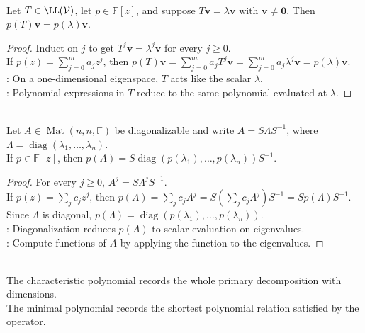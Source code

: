 \begin{proposition} \label{prop:polynomial-eigenvector-evaluation} \\
Let $T\in\LL(\mathcal{V})$, let $p\in\mathbb{F}[z]$, and suppose $T\mathbf{v}=\lambda\mathbf{v}$ with $\mathbf{v}\neq\mathbf{0}$. Then $p(T)\mathbf{v}=p(\lambda)\mathbf{v}$.
\begin{proof}
Induct on $j$ to get $T^j\mathbf{v}=\lambda^j\mathbf{v}$ for every $j\geq0$.\\
If $p(z)=\sum\limits_{j=0}^{m}a_jz^j$, then $p(T)\mathbf{v} =\sum\limits_{j=0}^{m}a_jT^j\mathbf{v} =\sum\limits_{j=0}^{m}a_j\lambda^j\mathbf{v} =p(\lambda)\mathbf{v}$.\\
: On a one-dimensional eigenspace, $T$ acts like the scalar $\lambda$.\\
: Polynomial expressions in $T$ reduce to the same polynomial evaluated at $\lambda$.
\end{proof}
\end{proposition}

\begin{theorem} \label{thm:polynomial-functional-calculus-diagonalizable-matrix} \\
Let $A\in\operatorname{Mat}(n,n,\mathbb{F})$ be diagonalizable and write $A=S\Lambda S^{-1}$, where $\Lambda=\operatorname{diag}(\lambda_1,\ldots,\lambda_n)$.\\
If $p\in\mathbb{F}[z]$, then $p(A)=S\operatorname{diag}(p(\lambda_1),\ldots,p(\lambda_n))S^{-1}$.
\begin{proof}
For every $j\geq0$, $A^j=S\Lambda^jS^{-1}$.\\
If $p(z)=\sum_j c_jz^j$, then $p(A)=\sum\limits_j c_jA^j =S\left(\sum\limits_j c_j\Lambda^j\right)S^{-1} =S p(\Lambda) S^{-1}$.\\
Since $\Lambda$ is diagonal, $p(\Lambda)=\operatorname{diag}(p(\lambda_1),\ldots,p(\lambda_n))$.\\
: Diagonalization reduces $p(A)$ to scalar evaluation on eigenvalues.\\
: Compute functions of $A$ by applying the function to the eigenvalues.
\end{proof}
\end{theorem}

\begin{motivation} \label{mot:characteristic-and-minimal-polynomials} \\
The characteristic polynomial records the whole primary decomposition with dimensions.\\
The minimal polynomial records the shortest polynomial relation satisfied by the operator.
\end{motivation}

